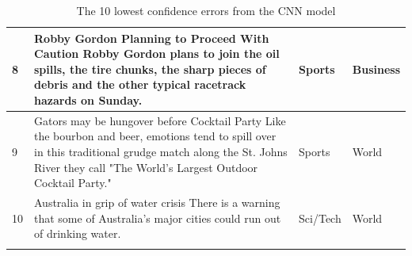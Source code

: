 \documentclass[12pt,a4paper,english]{article}
\begin{document}
\begin{table}[H]
\begin{longtable}{| m{2em} | m{25em} | m{5em} | m{5em} |}
    8 & Robby Gordon Planning to Proceed With Caution Robby Gordon plans to join the oil spills, the tire chunks, the sharp pieces of debris and the other typical racetrack hazards on Sunday. & Sports & Business \\ \hline
    
    9 & Gators may be hungover before Cocktail Party Like the bourbon and beer, emotions tend to spill over in this traditional grudge match along the St. Johns River they call "The World's Largest Outdoor Cocktail Party." & Sports & World \\ \hline
    
    10 & Australia in grip of water crisis There is a warning that some of Australia's major cities could run out of drinking water. & Sci/Tech & World \\ \hline

\caption{The 10 lowest confidence errors from the CNN model}
\label{tab:misclassificationCNN}
\end{longtable}
\end{table}
\end{document}
